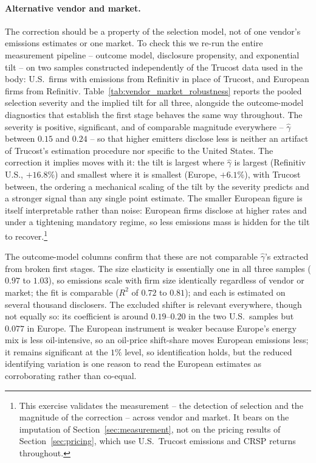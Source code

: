 \documentclass[a4paper,12pt]{article}
\begin{document}
\paragraph{Alternative vendor and market.} The correction should be a property of the selection model, not of one vendor's emissions estimates or one market. To check this we re-run the entire measurement pipeline -- outcome model, disclosure propensity, and exponential tilt -- on two samples constructed independently of the Trucost data used in the body: U.S.\ firms with emissions from Refinitiv in place of Trucost, and European firms from Refinitiv. Table~\ref{tab:vendor_market_robustness} reports the pooled selection severity and the implied tilt for all three, alongside the outcome-model diagnostics that establish the first stage behaves the same way throughout. The severity is positive, significant, and of comparable magnitude everywhere -- $\hat\gamma$ between $0.15$ and $0.24$ -- so that higher emitters disclose less is neither an artifact of Trucost's estimation procedure nor specific to the United States. The correction it implies moves with it: the tilt is largest where $\hat\gamma$ is largest (Refinitiv U.S., $+16.8\%$) and smallest where it is smallest (Europe, $+6.1\%$), with Trucost between, the ordering a mechanical scaling of the tilt by the severity predicts and a stronger signal than any single point estimate. The smaller European figure is itself interpretable rather than noise: European firms disclose at higher rates and under a tightening mandatory regime, so less emissions mass is hidden for the tilt to recover.\footnote{This exercise validates the measurement -- the detection of selection and the magnitude of the correction -- across vendor and market. It bears on the imputation of Section~\ref{sec:measurement}, not on the pricing results of Section~\ref{sec:pricing}, which use U.S.\ Trucost emissions and CRSP returns throughout.}

The outcome-model columns confirm that these are not comparable $\hat\gamma$'s extracted from broken first stages. The size elasticity is essentially one in all three samples ($0.97$ to $1.03$), so emissions scale with firm size identically regardless of vendor or market; the fit is comparable ($R^2$ of $0.72$ to $0.81$); and each is estimated on several thousand disclosers. The excluded shifter is relevant everywhere, though not equally so: its coefficient is around $0.19$--$0.20$ in the two U.S.\ samples but $0.077$ in Europe. The European instrument is weaker because Europe's energy mix is less oil-intensive, so an oil-price shift-share moves European emissions less; it remains significant at the $1\%$ level, so identification holds, but the reduced identifying variation is one reason to read the European estimates as corroborating rather than co-equal.
\end{document}
